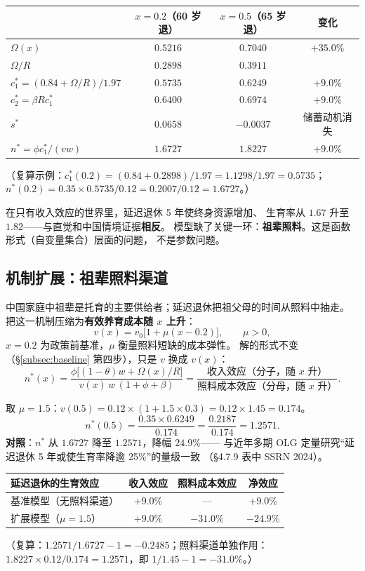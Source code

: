 \begin{center}
\small
\begin{tabular}{lccc}
\toprule
 & $x=0.2$（60 岁退） & $x=0.5$（65 岁退） & 变化 \\
\midrule
$\Omega(x)$ & $0.5216$ & $0.7040$ & $+35.0\%$ \\
$\Omega/R$ & $0.2898$ & $0.3911$ & \\
$c_1^*=(0.84+\Omega/R)/1.97$ & $0.5735$ & $0.6249$ & $+9.0\%$ \\
$c_2^*=\beta Rc_1^*$ & $0.6400$ & $0.6974$ & $+9.0\%$ \\
$s^*$ & $0.0658$ & $-0.0037$ & 储蓄动机消失 \\
$n^*=\phi c_1^*/(vw)$ & $1.6727$ & $1.8227$ & $+9.0\%$ \\
\bottomrule
\end{tabular}
\end{center}
（复算示例：$c_1^*(0.2)=(0.84+0.2898)/1.97=1.1298/1.97=0.5735$；
$n^*(0.2)=0.35\times0.5735/0.12=0.2007/0.12=1.6727$。）

在只有收入效应的世界里，延迟退休 5 年使终身资源增加、
生育率从 $1.67$ 升至 $1.82$——与直觉和中国情境证据\textbf{相反}。
模型缺了关键一环：\textbf{祖辈照料}。这是函数形式（自变量集合）层面的问题，
不是参数问题。

\subsection{机制扩展：祖辈照料渠道}\label{subsec:care}

中国家庭中祖辈是托育的主要供给者；延迟退休把祖父母的时间从照料中抽走。
把这一机制压缩为\textbf{有效养育成本随 $x$ 上升}：
\[
v(x)=v_0\bigl[1+\mu(x-0.2)\bigr],\qquad \mu>0,
\]
$x=0.2$ 为政策前基准，$\mu$ 衡量照料短缺的成本弹性。
解的形式不变（§\ref{subsec:baseline} 第四步），只是 $v$ 换成 $v(x)$：
\[
n^*(x)=\frac{\phi\bigl[(1-\theta)w+\Omega(x)/R\bigr]}{v(x)\,w\,(1+\phi+\beta)}
=\frac{\text{收入效应（分子，随 }x\text{ 升）}}{\text{照料成本效应（分母，随 }x\text{ 升）}}.
\]

取 $\mu=1.5$：$v(0.5)=0.12\times(1+1.5\times0.3)=0.12\times1.45=0.174$。
\[
n^*(0.5)=\frac{0.35\times0.6249}{0.174}=\frac{0.2187}{0.174}=1.2571.
\]
\textbf{对照}：$n^*$ 从 $1.6727$ 降至 $1.2571$，降幅 $24.9\%$——
与近年多期 OLG 定量研究“延迟退休 5 年或使生育率降逾 25\%”的量级一致
（§4.7.9 表中 SSRN 2024）。

\begin{center}
\small
\begin{tabular}{lccc}
\toprule
延迟退休的生育效应 & 收入效应 & 照料成本效应 & 净效应 \\
\midrule
基准模型（无照料渠道） & $+9.0\%$ & --- & $+9.0\%$ \\
扩展模型（$\mu=1.5$） & $+9.0\%$ & $-31.0\%$ & $\mathbf{-24.9\%}$ \\
\bottomrule
\end{tabular}
\end{center}
（复算：$1.2571/1.6727-1=-0.2485$；照料渠道单独作用：
$1.8227\times0.12/0.174=1.2571$，即 $1/1.45-1=-31.0\%$。）

